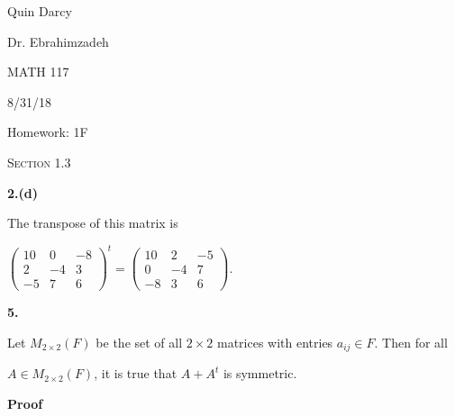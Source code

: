 \documentclass[12pt, a4paper]{article}
\begin{document}
 
 \begin{flushleft}
 
 Quin Darcy\par
 Dr. Ebrahimzadeh\par
 MATH 117\par
 8/31/18
 
 \end{flushleft}
 
 \centerline{Homework: 1F}
 
 \vspace{4mm}
 
 \noindent\textsc{Section 1.3}\par
 
 \justifying
 
 \vspace{1mm}
 
 \hline
 
 \vspace{4mm}
 
 \noindent\textbf{ 2.(d)}\par
 
 \vspace{4mm}
 
 The transpose of this matrix is
 
 \vspace{8mm}
 
 \centerline{${\left( \begin{array}{ccc} 10 & 0 & -8\\ 2 & -4 & 3\\ -5 & 7 & 6\end{array}\right)}^{t}=\left( \begin{array}{ccc} 10 & 2 & -5\\ 0 & -4 & 7\\ -8 & 3 & 6\end{array}\right)$.}
 
 \vspace{6mm}
 
 \noindent\textbf{5.}\par Let $M_{2\times 2}(F)$ be the set of all $2\times2$ matrices with entries $a_{ij}\in F$. Then for all\par $A\in M_{2\times 2}(F)$, it is true that $A+A^t$ is symmetric.\par
 
 \vspace{4mm}
 
 \textbf{Proof}\par 
 
 \vspace{2mm}
 
\end{document}
